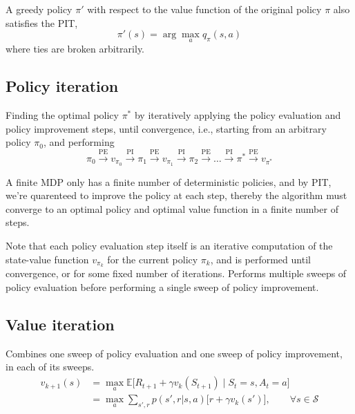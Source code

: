 A greedy policy \( \pi' \) with respect to the value function of the original policy \( \pi \) also satisfies the PIT,
\begin{equation}
    \pi'(s) = \arg\max_{a} q_\pi(s, a)
\end{equation}
where ties are broken arbitrarily.

\subsection{Policy iteration}

Finding the optimal policy \( \pi^* \) by iteratively applying the policy evaluation and policy improvement steps, until convergence, i.e., starting from an arbitrary policy \( \pi_0 \), and performing
\begin{equation}
    \pi_0 \xrightarrow{\text{PE}} v_{\pi_0} \xrightarrow{\text{PI}} \pi_1 \xrightarrow{\text{PE}} v_{\pi_1} \xrightarrow{\text{PI}} \pi_2 \xrightarrow{\text{PE}} \dots \xrightarrow{\text{PI}} \pi^* \xrightarrow{\text{PE}} v_{\pi^*}
\end{equation}

A finite MDP only has a finite number of deterministic policies, and by PIT, we're quarenteed to improve the policy at each step, thereby the algorithm must converge to an optimal policy and optimal value function in a finite number of steps.

Note that each policy evaluation step itself is an iterative computation  of the state-value function \( v_{\pi_k} \) for the current policy \( \pi_k \), and is performed until convergence, or for some fixed number of iterations.
Performs multiple sweeps of policy evaluation before performing a single sweep of policy improvement.

\subsection{Value iteration}

Combines one sweep of policy evaluation and one sweep of policy improvement, in each of its sweeps.
\begin{equation}
    \begin{aligned}
        v_{k+1}(s)
         & =
        \max_{a} \mathbb{E} \big[ R_{t+1} + \gamma v_k(S_{t+1}) \;\big|\; S_t = s, A_t = a \big]
        \\ & =
        \max_{a} \sum_{s', r} p(s', r | s, a) \Big[ r + \gamma v_k(s') \Big]
        , \qquad \forall s \in \mathcal{S}
    \end{aligned}
\end{equation}

